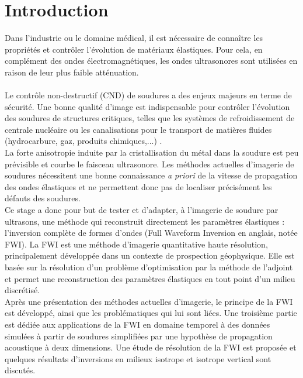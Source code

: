 \chapter*{Introduction}

Dans l'industrie ou le domaine médical, il est nécessaire de connaître les propriétés et contrôler l'évolution de matériaux élastiques. Pour cela, en complément des ondes électromagnétiques,  les ondes ultrasonores sont utilisées en raison de leur plus faible atténuation.\\~\\

Le contrôle non-destructif (CND) de soudures a des enjeux majeurs en terme de sécurité. Une bonne qualité d'image est indispensable pour contrôler l'évolution des soudures de structures critiques, telles que les systèmes de refroidissement de centrale nucléaire ou les canalisations pour le transport de matières fluides (hydrocarbure, gaz, produits chimiques,...) . \\

La forte anisotropie induite par la cristallisation du métal dans la soudure est peu prévisible et courbe le faisceau ultrasonore. Les méthodes actuelles d'imagerie de soudures nécessitent une bonne connaissance \emph{a priori} de la vitesse de propagation des ondes élastiques et ne permettent donc pas de localiser précisément les défauts des soudures. \\


Ce stage a donc pour but de tester et d'adapter, à l'imagerie de soudure par ultrasons, une méthode qui reconstruit directement les paramètres élastiques :  l'inversion complète de formes d'ondes (Full Waveform Inversion en anglais, notée FWI). La FWI est une méthode d'imagerie quantitative haute résolution, principalement développée dans un contexte de prospection géophysique. Elle est basée sur la résolution d'un problème d'optimisation par la méthode de l'adjoint et permet une reconstruction des paramètres élastiques en tout point d'un milieu discrétisé. \\

Après une présentation des méthodes actuelles d'imagerie, le principe de la FWI est développé, ainsi que les problématiques qui lui sont liées.
Une troisième partie est dédiée aux applications de la FWI en domaine temporel à des données simulées à partir de soudures simplifiées par une hypothèse de propagation acoustique à deux dimensions. Une étude de résolution de la FWI est proposée et quelques résultats d'inversions en milieux isotrope et isotrope vertical sont discutés.









